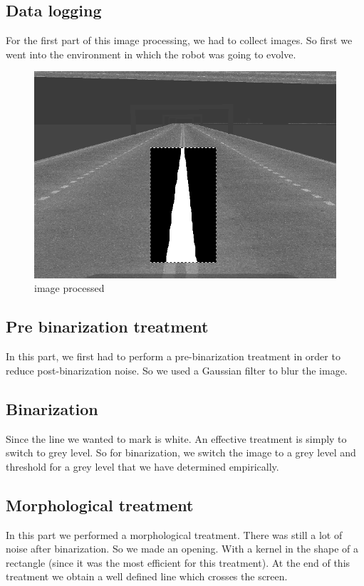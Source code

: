 \subsection{Data logging}
For the first part of this image processing, we had to collect images.
So first we went into the environment in which the robot was going to evolve.

\begin{figure}[ht!]
    \begin{center}
        \includegraphics[scale=0.3]{Images/image_process.png}
    \end{center}
    \caption{image processed}
    \label{fig:img_processing}
\end{figure}

\subsection{Pre binarization treatment}
In this part, we first had to perform a pre-binarization treatment in order to reduce post-binarization noise.
So we used a Gaussian filter to blur the image.

\subsection{Binarization}
Since the line we wanted to mark is white. An effective treatment is simply to switch to grey level. 
So for binarization, we switch the image to a grey level and threshold for a grey level that we have determined empirically.

\subsection{Morphological treatment}
In this part we performed a morphological treatment. There was still a lot of noise after binarization. So we made an opening. 
With a kernel in the shape of a rectangle (since it was the most efficient for this treatment).
At the end of this treatment we obtain a well defined line which crosses the screen.

